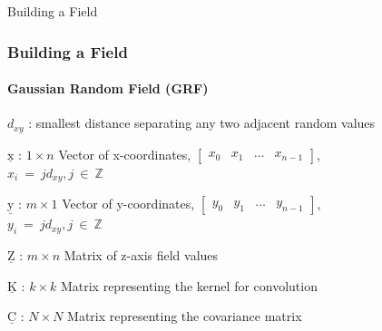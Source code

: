 \documentclass[professionalfont,10pt]{beamer}
\begin{document}
	\begin{frame}[t]{Building a Field}
		\frametitle{Building a Field}
		\framesubtitle{Gaussian Random Field (GRF)}
		\hskip-0.75cm
		\begin{minipage}[t]{0.2\linewidth}\vspace{-0.5cm}
			\tiny\tableofcontents[currentsection,currentsubsection,hideothersubsections,subsectionstyle=show/shaded]
		\end{minipage}
		\hfill%
		\begin{minipage}[t]{0.86\linewidth}\vspace{-0.5cm}
			\begin{flushleft}
				$d_{xy}$ : smallest distance separating any two adjacent random values 
				
				$\underline{\text{x}}$ : $1 \times n$ Vector of x-coordinates, $\left[\begin{array}{cccc}x_0 & x_1 & \dots & x_{n-1}\end{array}\right]$,\\
				$ x_i~=~jd_{xy}, j~\in~\mathbb{Z}$
				
				$\underline{\text{y}}$ : $m \times 1$ Vector of y-coordinates, $\left[\begin{array}{cccc}y_0 & y_1 & \dots & y_{n-1}\end{array}\right]$,\\
				$ y_i~=~jd_{xy}, j~\in~\mathbb{Z}$

				
				$\underline{\text{Z}}$ : $m \times n$ Matrix of z-axis field values 
				
				$\underline{\text{K}}$ : $k \times k$ Matrix representing the kernel for convolution
	
				$\underline{\text{C}}$ : $N \times N$ Matrix representing the covariance matrix
			\end{flushleft}
		\end{minipage}
		\vfill%
	\end{frame}
	
\end{document}

